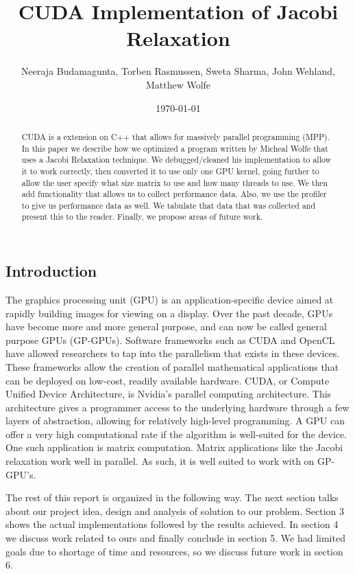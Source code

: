 \documentclass[10pt]{article}
\title{CUDA Implementation of Jacobi Relaxation}
\author{Neeraja Budamagunta, Torben Rasmussen, Sweta Sharma, John Wehland, Matthew Wolfe}
\date{\today}
\renewcommand\theFancyVerbLine{\small\arabic{FancyVerbLine}}
\begin{document}
\renewcommand{\theFancyVerbLine}{
\sffamily\textcolor[rgb]{0.5,0.5,0.5}{\scriptsize\arabic{FancyVerbLine}}}

\maketitle

\begin{multicols}{2}
  \begin{abstract}
    CUDA is a extension on C++ that allows for massively parallel programming (MPP).
    In this paper we describe how we optimized a program written by Micheal Wolfe that uses a Jacobi Relaxation technique.
    We debugged/cleaned his implementation to allow it to work correctly, then converted it to use only one GPU kernel, going further to allow the user specify what size matrix to use and how many threads to use.
    We then add functionality that allows us to collect performance data.
    Also, we use the profiler to give us performance data as well.
    We tabulate that data that was collected and present this to the reader.
    Finally, we propose areas of future work.
  \end{abstract}

  \section{Introduction} %
  The graphics processing unit (GPU) is an application-specific device aimed at rapidly building images for viewing on a display.
  Over the past decade, GPUs have become more and more general purpose, and can now be called general purpose GPUs (GP-GPUs).
  Software frameworks such as CUDA and OpenCL have allowed researchers to tap into the parallelism that exists in these devices.
  These frameworks allow the creation of parallel mathematical applications that can be deployed on low-cost, readily available hardware.
  CUDA, or Compute Unified Device Architecture, is Nvidia's parallel computing architecture.
  This architecture gives a programmer access to the underlying hardware through a few layers of abstraction, allowing for relatively high-level programming.
  A GPU can offer a very high computational rate if the algorithm is well-suited for the device.
  One such application is matrix computation.
  Matrix applications like the Jacobi relaxation work well in parallel.
  As such, it is well suited to work with on GP-GPU’s.

  The rest of this report is organized in the following way.
  The next section talks about our project idea, design and analysis of solution to our problem.
  Section 3 shows the actual implementations followed by the results achieved.
  In section 4 we discuss work related to ours and finally conclude in section 5.
  We had limited goals due to shortage of time and resources, so we discuss future work in section 6.


\end{multicols}
\end{document}
